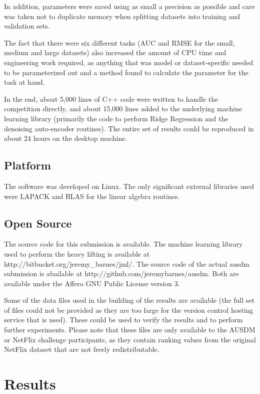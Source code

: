 \documentclass{article}
\begin{document}
In addition, parameters were saved using as small a precision as possible and care was taken not to duplicate memory when splitting datasets into training and validation sets.

The fact that there were six different tasks (AUC and RMSE for the small, medium and large datasets) also increased the amount of CPU time and engineering work required, as anything that was model or dataset-specific needed to be parameterized out and a method found to calculate the parameter for the task at hand.

In the end, about 5,000 lines of C++ code were written to handle the competition directly, and about 15,000 lines added to the underlying machine learning library (primarily the code to perform Ridge Regression and the denoising auto-encoder routines).  The entire set of results could be reproduced in about 24 hours on the desktop machine.

\subsection{Platform}

The software was developed on Linux.  The only significant external libraries used were LAPACK and BLAS for the linear algebra routines.

\subsection{Open Source}

The source code for this submission is available.  The machine learning library used to perform the heavy lifting is available at http://bitbucket.org/jeremy\_barnes/jml/.  The source code of the actual ausdm submission is abailable at http://github.com/jeremybarnes/ausdm.  Both are available under the Affero GNU Public License version 3.

Some of the data files used in the building of the results are available (the full set of files could not be provided as they are too large for the version control hosting service that is used).  These could be used to verify the results and to perform further experiments.  Please note that these files are only available to the AUSDM or NetFlix challenge participants, as they contain ranking values from the original NetFlix dataset that are not freely redistributable.

\section{Results}
\end{document}
